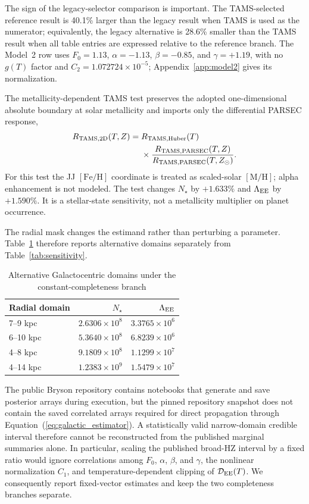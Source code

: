 The sign of the legacy-selector comparison is important. The TAMS-selected reference result is 40.1\% larger than the legacy result when TAMS is used as the numerator; equivalently, the legacy alternative is 28.6\% smaller than the TAMS result when all table entries are expressed relative to the reference branch. The Model~2 row uses $F_0=1.13$, $\alpha=-1.13$, $\beta=-0.85$, and $\gamma=+1.19$, with no $g(T)$ factor and $C_2=1.072724\times10^{-5}$; Appendix~\ref{app:model2} gives its normalization.

The metallicity-dependent TAMS test preserves the adopted one-dimensional absolute boundary at solar metallicity and imports only the differential PARSEC response,
\begin{align}
 R_{\rm TAMS,2D}(T,Z)={}&R_{\rm TAMS,Huber}(T)\nonumber\\
 &\times\frac{R_{\rm TAMS,PARSEC}(T,Z)}
 {R_{\rm TAMS,PARSEC}(T,Z_\odot)}.
 \label{eq:tams2d}
\end{align}
For this test the JJ $[\mathrm{Fe/H}]$ coordinate is treated as scaled-solar $[\mathrm{M/H}]$; alpha enhancement is not modeled. The test changes $N_\star$ by $+1.633\%$ and $\Lambda_{\rm EE}$ by $+1.590\%$. It is a stellar-state sensitivity, not a metallicity multiplier on planet occurrence.

The radial mask changes the estimand rather than perturbing a parameter. Table~\ref{tab:domains} therefore reports alternative domains separately from Table~\ref{tab:sensitivity}.

\begin{table}[t]
\caption{Alternative Galactocentric domains under the constant-completeness branch}
\label{tab:domains}
\centering
\begin{tabular}{lrr}
\toprule
Radial domain & $N_\star$ & $\Lambda_{\rm EE}$\\
\midrule
7--9 kpc & $2.6306\times10^8$ & $3.3765\times10^6$\\
6--10 kpc & $5.3640\times10^8$ & $6.8239\times10^6$\\
4--8 kpc & $9.1809\times10^8$ & $1.1299\times10^7$\\
4--14 kpc & $1.2383\times10^9$ & $1.5479\times10^7$\\
\bottomrule
\end{tabular}
\end{table}

The public Bryson repository contains notebooks that generate and save posterior arrays during execution, but the pinned repository snapshot does not contain the saved correlated arrays required for direct propagation through Equation~(\ref{eq:galactic_estimator}). A statistically valid narrow-domain credible interval therefore cannot be reconstructed from the published marginal summaries alone. In particular, scaling the published broad-HZ interval by a fixed ratio would ignore correlations among $F_0$, $\alpha$, $\beta$, and $\gamma$, the nonlinear normalization $C_1$, and temperature-dependent clipping of $\mathcal{D}_{\rm EE}(T)$. We consequently report fixed-vector estimates and keep the two completeness branches separate.
